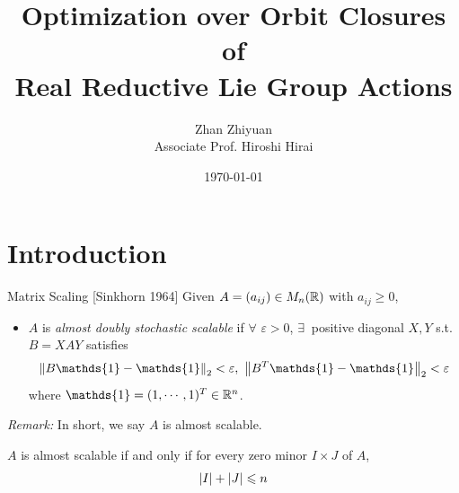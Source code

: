 \documentclass{beamer}
\title[]{Optimization over Orbit Closures of \\ Real Reductive Lie Group Actions}
\author[Zhan Zhiyuan]{Zhan Zhiyuan \\ {\small Associate Prof. Hiroshi Hirai}}
\date{\today}
\begin{document}
	\frame{\titlepage}

	\begin{frame}
		\tableofcontents
	\end{frame}
	
	\AtBeginSection[]{
		\begin{frame}
			\tableofcontents[currentsection]
		\end{frame}
	}

	\section{Introduction}
	\begin{frame}{Matrix Scaling [Sinkhorn\nocite{key14} 1964]}
		Given $A = (a_{ij}) \in M_n(\mathbb{R})$ with $a_{ij} \geqslant 0$, 
		\begin{itemize}
			\item $A$ is \emph{almost doubly stochastic scalable} if $\forall$ $\varepsilon > 0$, $\exists~$ positive diagonal $X,Y$ s.t. $B = XAY$ satisfies
 			\begin{equation*}
 				\norm{B\mathds{1}- \mathds{1}}_2 < \varepsilon,~\norm{B^T\mathds{1}- \mathds{1}}_2 < \varepsilon
 			\end{equation*}
 			where $\mathds{1} = (1,\cdots,1)^T \in \R^n$.
		\end{itemize}
		\emph{Remark:} In short, we say $A$ is almost scalable.
		\vspace{0.5em}
		\begin{thm}
 			$A$ is almost scalable if and only if for every zero minor $I \times J$ of $A$,
 			\vspace{-0.5em}
 			\begin{equation*}
 				\left\lvert I\right\lvert + \left\lvert J\right\lvert \leqslant n
 			\end{equation*}
 		\end{thm}
	\end{frame}
\end{document}
